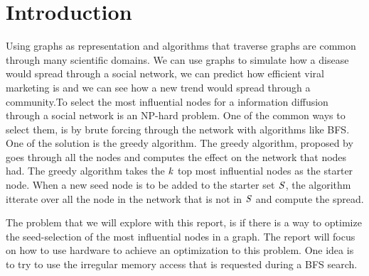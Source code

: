 \chapter{Introduction} 

Using graphs as representation and algorithms that traverse graphs are common through many scientific domains\cite{HybridBFS2015}. We can use graphs to simulate how a disease would spread through a social network, we can predict how efficient viral marketing is and we can see how a new trend would spread through a community\cite{MaximizeSpread2003}.To select the most influential nodes for a information diffusion through a social network is an NP-hard problem\cite{MaximizeSpread2003}. One of the common ways to select them, is by brute forcing through the network with algorithms like BFS. One of the solution is the greedy algorithm\cite{MaximizeSpread2015}. The greedy algorithm, proposed by\cite{MaximizeSpread2003} goes through all the nodes and computes the effect on the network that nodes had. The greedy algorithm takes the $\it{k}$ top most influential nodes as the starter node. When a new seed node is to be added to the starter set $\it{S}$, the algorithm itterate over all the node in the network that is not in $\it{S}$ and compute the spread.


The problem that we will explore with this report, is if there is a way to optimize the seed-selection of the most influential nodes in a graph. The report will focus on how to use hardware to achieve an optimization to this problem. One idea is to try to use the irregular memory access that is requested during a BFS search. 

